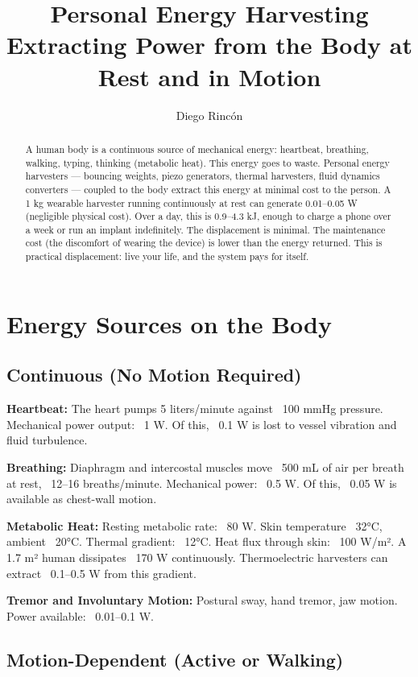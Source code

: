 \documentclass[12pt]{article}
\title{Personal Energy Harvesting\\
Extracting Power from the Body at Rest and in Motion}
\author{Diego Rincón}
\date{}
\begin{document}
\maketitle

\begin{abstract}
A human body is a continuous source of mechanical energy: heartbeat, breathing, walking, typing, thinking (metabolic heat). This energy goes to waste. Personal energy harvesters — bouncing weights, piezo generators, thermal harvesters, fluid dynamics converters — coupled to the body extract this energy at minimal cost to the person. A 1 kg wearable harvester running continuously at rest can generate 0.01–0.05 W (negligible physical cost). Over a day, this is 0.9–4.3 kJ, enough to charge a phone over a week or run an implant indefinitely. The displacement is minimal. The maintenance cost (the discomfort of wearing the device) is lower than the energy returned. This is practical displacement: live your life, and the system pays for itself.
\end{abstract}

\section{Energy Sources on the Body}

\subsection{Continuous (No Motion Required)}

\textbf{Heartbeat:} The heart pumps 5 liters/minute against ~100 mmHg pressure. Mechanical power output: ~1 W. Of this, ~0.1 W is lost to vessel vibration and fluid turbulence.

\textbf{Breathing:} Diaphragm and intercostal muscles move ~500 mL of air per breath at rest, ~12–16 breaths/minute. Mechanical power: ~0.5 W. Of this, ~0.05 W is available as chest-wall motion.

\textbf{Metabolic Heat:} Resting metabolic rate: ~80 W. Skin temperature ~32°C, ambient ~20°C. Thermal gradient: ~12°C. Heat flux through skin: ~100 W/m². A 1.7 m² human dissipates ~170 W continuously. Thermoelectric harvesters can extract ~0.1–0.5 W from this gradient.

\textbf{Tremor and Involuntary Motion:} Postural sway, hand tremor, jaw motion. Power available: ~0.01–0.1 W.

\subsection{Motion-Dependent (Active or Walking)}
\end{document}
